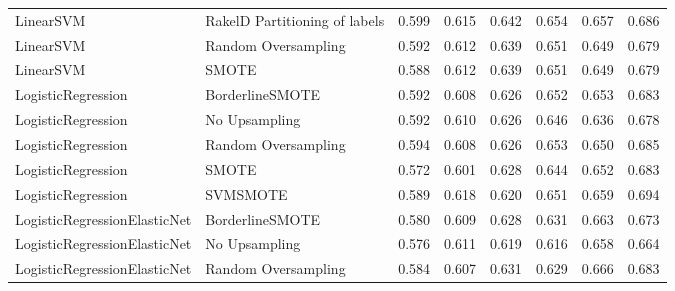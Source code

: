 \begin{tabular}{llllllll}
                      LinearSVM & RakelD Partitioning of labels & 0.599 &                     0.615 &                 0.642 &                  0.654 &                                   0.657 &     0.686 \\
                      LinearSVM &           Random Oversampling & 0.592 &                     0.612 &                 0.639 &                  0.651 &                                   0.649 &     0.679 \\
                      LinearSVM &                         SMOTE & 0.588 &                     0.612 &                 0.639 &                  0.651 &                                   0.649 &     0.679 \\
             LogisticRegression &               BorderlineSMOTE & 0.592 &                     0.608 &                 0.626 &                  0.652 &                                   0.653 &     0.683 \\
             LogisticRegression &                 No Upsampling & 0.592 &                     0.610 &                 0.626 &                  0.646 &                                   0.636 &     0.678 \\
             LogisticRegression &           Random Oversampling & 0.594 &                     0.608 &                 0.626 &                  0.653 &                                   0.650 &     0.685 \\
             LogisticRegression &                         SMOTE & 0.572 &                     0.601 &                 0.628 &                  0.644 &                                   0.652 &     0.683 \\
             LogisticRegression &                      SVMSMOTE & 0.589 &                     0.618 &                 0.620 &                  0.651 &                                   0.659 &     0.694 \\
   LogisticRegressionElasticNet &               BorderlineSMOTE & 0.580 &                     0.609 &                 0.628 &                  0.631 &                                   0.663 &     0.673 \\
   LogisticRegressionElasticNet &                 No Upsampling & 0.576 &                     0.611 &                 0.619 &                  0.616 &                                   0.658 &     0.664 \\
   LogisticRegressionElasticNet &           Random Oversampling & 0.584 &                     0.607 &                 0.631 &                  0.629 &                                   0.666 &     0.683 \\

\end{tabular}
